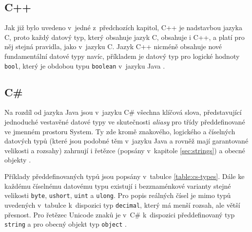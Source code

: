 \documentclass[onepage, a4paper, 12pt]{bakalarka}
\begin{document}
\subsection{C++}
Jak již bylo uvedeno v~jedné z~předchozích kapitol, C++ je nadstavbou jazyka C, proto každý datový typ, který obsahuje jazyk C, obsahuje i C++, a platí pro něj stejná pravidla, jako v~jazyku C. Jazyk C++ nicméně obsahuje nové fundamentální datové typy navíc, příkladem je datový typ pro logické hodnoty \texttt{bool}, který je obdobou typu \texttt{boolean} v~jazyku Java \cite{cpp-book, cpp-guide-types}.\par

\subsection{C\#}
Na rozdíl od jazyka Java jsou v~jazyku C\# všechna klíčová slova, představující jednoduché vestavěné datové typy ve skutečnosti \textit{aliasy} pro třídy předdefinované ve jmenném prostoru System. Ty zde kromě znakového, logického a číselných datových typů (které jsou podobné těm v~jazyku Java a rovněž mají garantované velikosti a rozsahy) zahrnují i řetězce (popsány v~kapitole \ref{sec:strings}) a obecné objekty \cite{cs-book, cs-guide-types, cs-guide-sbyte, cs-guide-short, cs-guide-int, cs-guide-long, cs-guide-float, cs-guide-double, cs-guide-bool, cs-guide-char}.

Příklady předdefinovaných typů jsou popsány v~tabulce \ref{table:cs-types}. Dále ke každému číselnému datovému typu existují i bezznaménkové varianty stejné velikosti \texttt{byte}, \texttt{ushort}, \texttt{uint} a \texttt{ulong}. Pro popis reálných čísel je mimo typů uvedených v~tabulce k~dispozici typ \texttt{decimal}, který má menší rozsah, ale větší přesnost. Pro řetězec Unicode znaků je v~C\# k~dispozici předdefinovaný typ \texttt{string} a pro obecný objekt typ \texttt{object} \cite{cs-book, cs-guide-types, cs-guide-byte, cs-guide-ushort, cs-guide-uint, cs-guide-ulong, cs-guide-decimal, cs-guide-string, cs-guide-object}.
\end{document}
